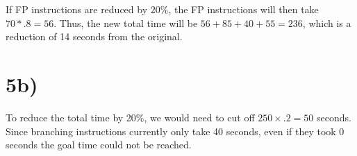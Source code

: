 \documentclass[a4paper,11pt]{article}
\begin{document}
If FP instructions are reduced by 20\%, the FP instructions will then take $70 * .8 = 56$.  Thus, the new total time will be $56 + 85 + 40 + 55 = 236$, which is a reduction of 14 seconds from the original.

\section*{5b)}

To reduce the total time by 20\%, we would need to cut off $250 \times .2 = 50$ seconds.  Since branching instructions currently only take 40 seconds, even if they took 0 seconds the goal time could not be reached.

\end{document}
